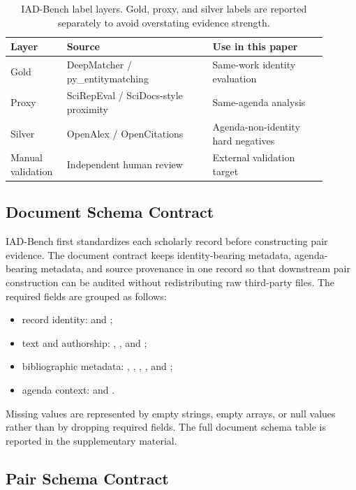 \documentclass[preprint,12pt]{elsarticle}
\begin{document}
\begin{table}[H]
\caption{IAD-Bench label layers. Gold, proxy, and silver labels are reported separately to avoid overstating evidence strength.}
\label{tab:label-layers}
\centering
\footnotesize
\setlength{\tabcolsep}{3pt}
\begin{tabular}{L{0.15\linewidth}L{0.42\linewidth}L{0.33\linewidth}}
\toprule
Layer & Source & Use in this paper \\
\midrule
Gold & DeepMatcher / py\_entitymatching & Same-work identity evaluation \\
Proxy & SciRepEval / SciDocs-style proximity & Same-agenda analysis \\
Silver & OpenAlex / OpenCitations & Agenda-non-identity hard negatives \\
Manual validation & Independent human review & External validation target \\
\bottomrule
\end{tabular}
\end{table}

\subsection{Document Schema Contract}

IAD-Bench first standardizes each scholarly record before constructing pair evidence. The document contract keeps identity-bearing metadata, agenda-bearing metadata, and source provenance in one record so that downstream pair construction can be audited without redistributing raw third-party files. The required fields are grouped as follows:
\begin{itemize}
\setlength{\itemsep}{0pt}
\item record identity:  and ;
\item text and authorship: , , and ;
\item bibliographic metadata: , , , , and ;
\item agenda context:  and .
\end{itemize}
Missing values are represented by empty strings, empty arrays, or null values rather than by dropping required fields. The full document schema table is reported in the supplementary material.

\subsection{Pair Schema Contract}
\end{document}
